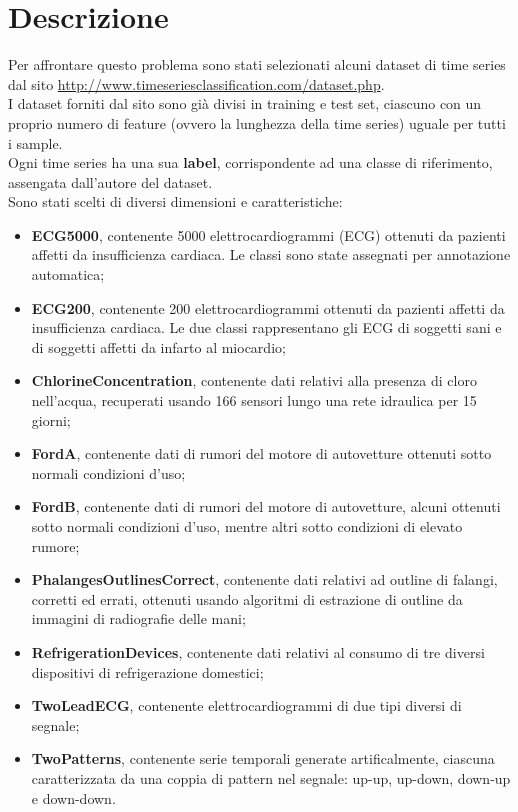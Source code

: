\section{Descrizione}
Per affrontare questo problema sono stati selezionati alcuni dataset di time series dal sito \url{http://www.timeseriesclassification.com/dataset.php}.\\
I dataset forniti dal sito sono già divisi in training e test set, ciascuno con un proprio numero di feature (ovvero la lunghezza della time series) uguale per tutti i sample.\\
Ogni time series ha una sua \textbf{label}, corrispondente ad una classe di riferimento, assengata dall'autore del dataset.\\
Sono stati scelti di diversi dimensioni e caratteristiche:
\begin{itemize}
	\item \textbf{ECG5000}, contenente 5000 elettrocardiogrammi (ECG) ottenuti da pazienti affetti da insufficienza cardiaca. Le classi sono state assegnati per annotazione automatica;
	\item \textbf{ECG200}, contenente 200 elettrocardiogrammi ottenuti da pazienti affetti da insufficienza cardiaca. Le due classi rappresentano gli ECG di soggetti sani e di soggetti affetti da infarto al miocardio;
	\item \textbf{ChlorineConcentration}, contenente dati relativi alla presenza di cloro nell'acqua, recuperati usando 166 sensori lungo una rete idraulica per 15 giorni;
	\item \textbf{FordA}, contenente dati di rumori del motore di autovetture ottenuti sotto normali condizioni d'uso;
	\item \textbf{FordB}, contenente dati di rumori del motore di autovetture, alcuni ottenuti sotto normali condizioni d'uso, mentre altri sotto condizioni di elevato rumore;
	\item \textbf{PhalangesOutlinesCorrect}, contenente dati relativi ad outline di falangi, corretti ed errati, ottenuti usando algoritmi di estrazione di outline da immagini di radiografie delle mani;
	\item \textbf{RefrigerationDevices}, contenente dati relativi al consumo di tre diversi dispositivi di refrigerazione domestici;
	\item \textbf{TwoLeadECG}, contenente elettrocardiogrammi di due tipi diversi di segnale;
	\item \textbf{TwoPatterns}, contenente serie temporali generate artificalmente, ciascuna caratterizzata da una coppia di pattern nel segnale: up-up, up-down, down-up e down-down.
\end{itemize}

